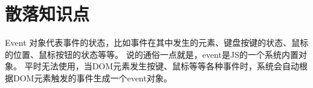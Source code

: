 \chapter{散落知识点}
Event 对象代表事件的状态，比如事件在其中发生的元素、键盘按键的状态、鼠标的位置、鼠标按钮的状态等等。 说的通俗一点就是，event是JS的一个系统内置对象。 平时无法使用，当DOM元素发生按键、鼠标等等各种事件时，系统会自动根据DOM元素触发的事件生成一个event对象。